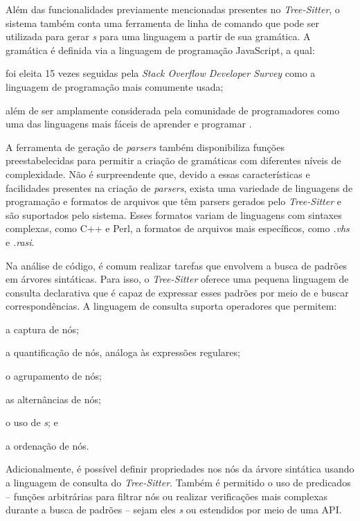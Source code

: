 \documentclass[11pt, a4paper, english, openright, twoside, brazil]{abntex2}
\begin{document}
Além das funcionalidades previamente mencionadas presentes no
\textit{Tree-Sitter}, o sistema também conta uma ferramenta de linha de comando
que pode ser utilizada para gerar \textit{s} para uma linguagem a
partir de sua gramática. A gramática é definida via a linguagem de programação
JavaScript, a qual:
\begin{inparaenum}
  \item foi eleita 15 vezes seguidas pela
        \textit{Stack Overflow Developer Survey}
        \cite{stack-overflow-2022-stack} como a linguagem de programação mais
        comumente usada;
  \item além de ser amplamente considerada pela comunidade de programadores
        como uma das linguagens mais fáceis de aprender e programar
        \cites {berkeley-2023-11}{goel-2023-how}{w3schools-2023-javascript}.
\end{inparaenum}
A ferramenta de geração de \textit{parsers} também disponibiliza funções
preestabelecidas para permitir a criação de gramáticas com diferentes níveis de
complexidade. Não é surpreendente que, devido a essas características e
facilidades presentes na criação de \textit{parsers}, exista uma variedade de
linguagens de programação e formatos de arquivos que têm parsers gerados pelo
\textit{Tree-Sitter} e são suportados pelo sistema. Esses formatos variam de
linguagens com sintaxes complexas, como C++ e Perl, a formatos de arquivos mais
específicos, como \textit{.vhs} e \textit{.rasi}.

Na análise de código, é comum realizar tarefas que envolvem a busca de padrões
em árvores sintáticas. Para isso, o \textit{Tree-Sitter} oferece uma pequena
linguagem de consulta declarativa que é capaz de expressar esses padrões por
meio de \textit{} e buscar correspondências. A linguagem de
consulta suporta operadores que permitem:
\begin{inparaenum}
  \item a captura de nós;
  \item a quantificação de nós, análoga às expressões regulares;
  \item o agrupamento de nós;
  \item as alternâncias de nós;
  \item o uso de \textit{s}; e
  \item a ordenação de nós.
\end{inparaenum}
Adicionalmente, é possível definir propriedades nos nós da árvore sintática
usando a linguagem de consulta do \textit{Tree-Sitter}. Também é permitido o
uso de predicados -- funções arbitrárias para filtrar nós ou realizar
verificações mais complexas durante a busca de padrões -- sejam eles
\textit{s} ou estendidos por meio de uma API.
\end{document}
